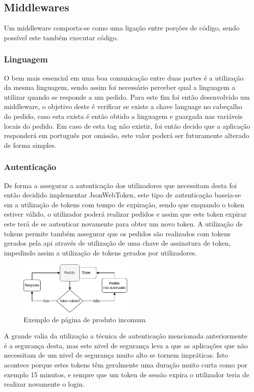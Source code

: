 \subsection{Middlewares} 
Um middleware comporta-se como uma ligação entre porções de código, sendo possível este também executar código.

\subsubsection{Linguagem}
O bem mais essencial em uma boa comunicação entre duas partes é a utilização da mesma linguagem, sendo assim foi necessário perceber
qual a linguagem a utilizar quando se responde a um pedido. Para este fim foi então desenvolvido um middleware,
o objetivo deste é verificar se existe a chave language no cabeçalho do pedido, caso esta exista é então obtido a linguagem e guargada
nas variáveis locais do pedido. Em caso de esta tag não existir, foi então decido que a aplicação responderá em português por omissão,
este valor poderá ser futuramente alterado de forma simples.

\subsubsection{Autenticação}
De forma a assegurar a autenticação dos utilizadores que necessitam desta foi então decidido implementar JsonWebToken,
este tipo de autenticação baseia-se em a utilização de tokens com tempo de expiração, sendo que enquando o token estiver válido,
o utilizador poderá realizar pedidos e assim que este token expirar este terá de se autenticar novamente para obter um novo token.
A utilização de tokens permite também assegurar que os pedidos são realizados com tokens gerados pela api através de utilização de uma chave
de assinatura de token, impedindo assim a utilização de tokens gerados por utilizadores.
\begin{figure}[htb]
  \centering
  \includegraphics[width=0.5\textwidth]{images/implementacao/api/jwt_session.png}
  \caption{Exemplo de página de produto incomum}
  \label{fig:62}
\end{figure}

A grande valia da utilização a técnica de autenticação mencionada anteriormente é a segurança desta, mas este nivel de segurança
leva a que as aplicações que não necessitam de um nivel de segurança muito alto se tornem impráticas. Isto acontece porque estes 
tokens têm geralmente uma duração muito curta como por exemplo 15 minutos, e sempre que um token de sessão expira o utilizador 
teria de realizar novamente o login.

